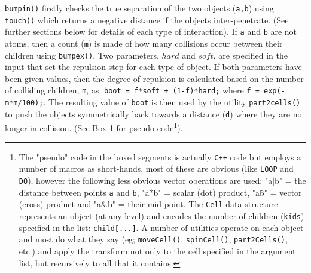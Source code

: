 {\tt bumpin()} firstly checks the true separation of the two objects ({\tt a,b}) using {\tt touch()}
which returns a negative distance if the objects inter-penetrate. (See further sections
below for details of each type of interaction).   If {\tt a} and {\tt b} are not atoms, then
a count ({\tt m}) is made of how many collisions occur between their children using {\tt bumpex()}.
Two parameters,  $hard$ and $soft$, are specified in the input that set the repulsion step
for each type of object.  If both parameters have been given values,
then the degree of repulsion is calculated based on the number of colliding children, {\tt m},
as:  {\tt boot = f*soft + (1-f)*hard;} where {\tt f = exp(-m*m/100);}.     The resulting value
of {\tt boot} is then used by the utility {\tt part2cells()} to push the objects symmetrically
back towards a distance ({\tt d}) where they are no longer in collision. (See Box 1 for
pseudo code\footnote{
The "pseudo" code in the boxed segments is actually {\tt C++} code but employs a number of macros
as short-hands, most of these are obvious (like {\tt LOOP} and {\tt DO}), however the following
less obvious vector oberations are used:
"{a$|$b}" = the distance between points {\tt a} and {\tt b},
"{a*b}" = scalar (dot) product,
"{a\^b}" = vector (cross) product and
"{a\&b}" = their mid-point.
The {\tt Cell} data structure represents an object (at any level) and encodes the 
number of children ({\tt kids}) specified in the list: {\tt child[...]}.
A number of utilities operate on each object and most do what they say (eg;
{\tt moveCell()}, {\tt spinCell()}, {\tt part2Cells()}, etc.) and apply the transform
not only to the cell specified in the argument list, but recursively to all that it 
contains.}).

